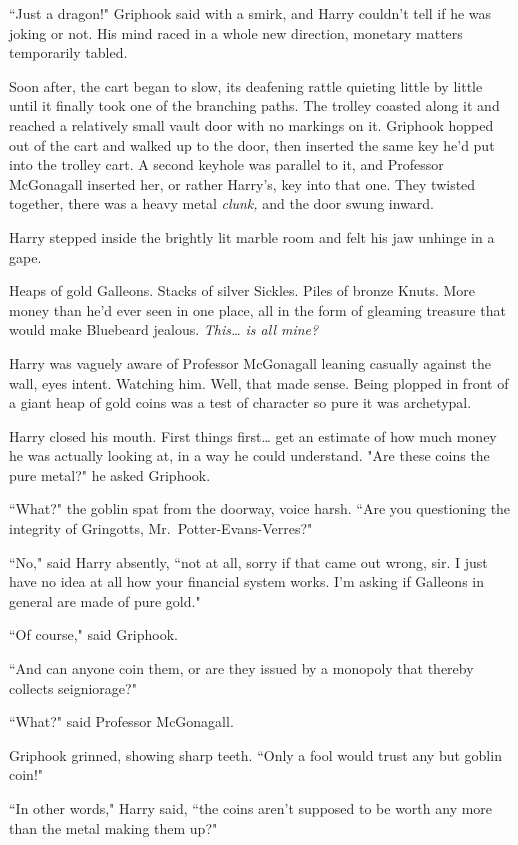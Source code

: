 ``Just a dragon!" Griphook said with a smirk, and Harry couldn't tell if he was joking or not. His mind raced in a whole new direction, monetary matters temporarily tabled.

Soon after, the cart began to slow, its deafening rattle quieting little by little until it finally took one of the branching paths. The trolley coasted along it and reached a relatively small vault door with no markings on it. Griphook hopped out of the cart and walked up to the door, then inserted the same key he'd put into the trolley cart. A second keyhole was parallel to it, and Professor McGonagall inserted her, or rather Harry's, key into that one. They twisted together, there was a heavy metal \emph{clunk,} and the door swung inward.

Harry stepped inside the brightly lit marble room and felt his jaw unhinge in a gape.

Heaps of gold Galleons. Stacks of silver Sickles. Piles of bronze Knuts. More money than he'd ever seen in one place, all in the form of gleaming treasure that would make Bluebeard jealous. \emph{This{\ldots} is all mine?}

Harry was vaguely aware of Professor McGonagall leaning casually against the wall, eyes intent. Watching him. Well, that made sense. Being plopped in front of a giant heap of gold coins was a test of character so pure it was archetypal.

Harry closed his mouth. First things first{\ldots} get an estimate of how much money he was actually looking at, in a way he could understand. "Are these coins the pure metal?" he asked Griphook.

``What?" the goblin spat from the doorway, voice harsh. ``Are you questioning the integrity of Gringotts, Mr.~Potter-Evans-Verres?"

``No," said Harry absently, ``not at all, sorry if that came out wrong, sir. I just have no idea at all how your financial system works. I'm asking if Galleons in general are made of pure gold."

``Of course," said Griphook.

``And can anyone coin them, or are they issued by a monopoly that thereby collects seigniorage?"

``What?" said Professor McGonagall.

Griphook grinned, showing sharp teeth. ``Only a fool would trust any but goblin coin!"

``In other words," Harry said, ``the coins aren't supposed to be worth any more than the metal making them up?"

